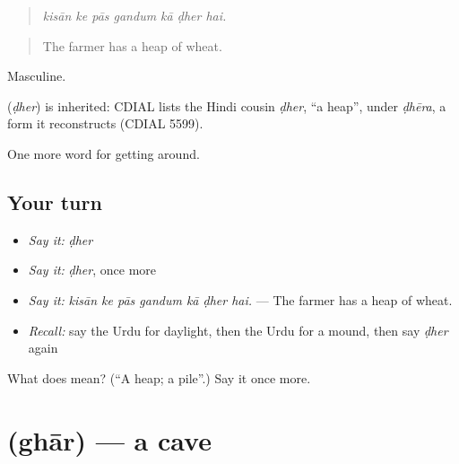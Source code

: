 \begin{quote}
      
\end{quote}

\begin{quote}
\emph{kisān ke pās gandum kā ḍher hai.}
\end{quote}

\begin{quote}
The farmer has a heap of wheat.
\end{quote}

Masculine.

\begin{cousinweb}
\textbf{} (\emph{ḍher}) is inherited: CDIAL lists the Hindi cousin \emph{ḍher}, \textquotedblleft{}a heap\textquotedblright{}, under \emph{ḍhēra}, a form it reconstructs (CDIAL 5599).
\end{cousinweb}

\begin{grammarlens}[title={What you've built}]
One more word for getting around.
\end{grammarlens}

\subsection*{Your turn}
\begin{itemize}
\raggedright
  \item \emph{Say it:} \emph{ḍher}
  \item \emph{Say it:} \emph{ḍher}, once more
  \item \emph{Say it:} \emph{kisān ke pās gandum kā ḍher hai.} — The farmer has a heap of wheat.
  \item \emph{Recall:} say the Urdu for daylight, then the Urdu for a mound, then say \emph{ḍher} again
\end{itemize}

\begin{tcolorbox}[breakable,colback=teal!4,colframe=teal!35!black,title={Before you move on}]
What does  mean? (\textquotedblleft{}A heap; a pile\textquotedblright{}.) Say it once more.
\end{tcolorbox}
\section[\texorpdfstring{\ur{غار} (ghār)}{غار (ghār)}]{ (ghār) — a cave}

\label{lesson:UR-C433-ghar}



